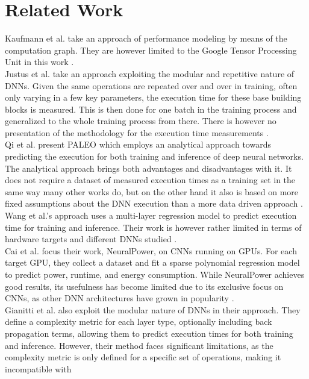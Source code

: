 \section{Related Work}
Kaufmann et al. take an approach of performance modeling by means of the computation graph. They are
however limited to the Google Tensor Processing Unit in this work \cite{kaufman_learned_2021}. \\
Justus et al. take an approach exploiting the modular and repetitive nature of DNNs. Given the same operations
are repeated over and over in training, often only varying in a few key parameters, the execution time for
these base building blocks is measured. This is then done for one batch in the training process and
generalized to the whole training process from there. There is however no presentation of the 
methodology for the execution time measurements \cite{justus_predicting_2018}. \\
Qi et al. present PALEO which employs an analytical approach towards predicting the execution for both
training and inference of deep neural networks. The analytical approach brings both advantages and disadvantages
with it. It does not require a dataset of measured execution times as a training set in the same way many 
other works do, but on the other hand it also is based on more fixed assumptions about the DNN execution 
than a more data driven approach \cite{qi_paleo_2017}. \\
Wang et al.'s approach uses a multi-layer regression model to predict execution time for training and inference.
Their work is however rather limited in terms of hardware targets and different DNNs studied \cite{wang_perfnet_2020}. \\
Cai et al. focus their work, NeuralPower, on CNNs running on GPUs. For each target GPU, they collect
a dataset and fit a sparse polynomial regression model to predict power, runtime, and energy consumption.
While NeuralPower achieves good results, its usefulness has become limited due to its exclusive focus on 
CNNs, as other DNN architectures have grown in popularity \cite{cai_neuralpower_nodate}. \\
Gianitti et al. also exploit the modular nature of DNNs in their approach. They define a complexity
metric for each layer type, optionally including back propagation terms, allowing them to predict
execution times for both training and inference. However, their method faces significant limitations,
as the complexity metric is only defined for a specific set of operations, making it incompatible with
